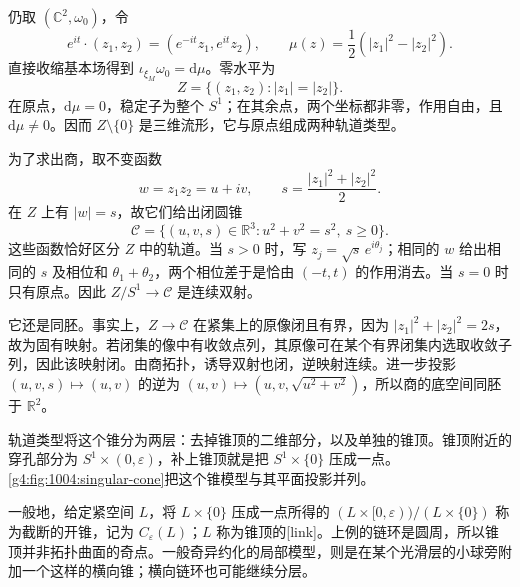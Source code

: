 \begin{example}\label{g4:exm:1004:singular-cone}
	仍取 \((\mathbb C^2,\omega_0)\)，令
	\begin{equation}\label{g4:eq:1004:opposite-weights}
		e^{it}\cdot(z_1,z_2)=(e^{-it}z_1,e^{it}z_2),
		\qquad \mu(z)=\frac12(|z_1|^2-|z_2|^2).
	\end{equation}
	直接收缩基本场得到 \(\iota_{\xi_M}\omega_0=\mathrm{d}\mu\)。零水平为
	\[
		Z=\{(z_1,z_2):|z_1|=|z_2|\}.
	\]
	在原点，\(\mathrm{d}\mu=0\)，稳定子为整个 \(S^1\)；在其余点，两个坐标都非零，作用自由，且 \(\mathrm{d}\mu\neq0\)。因而 \(Z\setminus\{0\}\) 是三维流形，它与原点组成两种轨道类型。

	为了求出商，取不变函数
	\[
		w=z_1z_2=u+iv,
		\qquad s=\frac{|z_1|^2+|z_2|^2}{2}.
	\]
	在 \(Z\) 上有 \(|w|=s\)，故它们给出闭圆锥
	\begin{equation}\label{g4:eq:1004:cone-equation}
		\mathcal C=\{(u,v,s)\in\mathbb R^3:u^2+v^2=s^2,\ s\ge0\}.
	\end{equation}
	这些函数恰好区分 \(Z\) 中的轨道。当 \(s>0\) 时，写 \(z_j=\sqrt{s}\,e^{i\theta_j}\)；相同的 \(w\) 给出相同的 \(s\) 及相位和 \(\theta_1+\theta_2\)，两个相位差于是恰由 \((-t,t)\) 的作用消去。当 \(s=0\) 时只有原点。因此 \(Z/S^1\to\mathcal C\) 是连续双射。

	它还是同胚。事实上，\(Z\to\mathcal C\) 在紧集上的原像闭且有界，因为 \(|z_1|^2+|z_2|^2=2s\)，故为固有映射。若闭集的像中有收敛点列，其原像可在某个有界闭集内选取收敛子列，因此该映射闭。由商拓扑，诱导双射也闭，逆映射连续。进一步投影 \((u,v,s)\mapsto(u,v)\) 的逆为 \((u,v)\mapsto(u,v,\sqrt{u^2+v^2})\)，所以商的底空间同胚于 \(\mathbb R^2\)。

	轨道类型将这个锥分为两层：去掉锥顶的二维部分，以及单独的锥顶。锥顶附近的穿孔部分为 \(S^1\times(0,\varepsilon)\)，补上锥顶就是把 \(S^1\times\{0\}\) 压成一点。\cref{g4:fig:1004:singular-cone}把这个锥模型与其平面投影并列。
\end{example}



一般地，给定紧空间 \(L\)，将 \(L\times\{0\}\) 压成一点所得的 \((L\times[0,\varepsilon))/(L\times\{0\})\) 称为截断的开锥，记为 \(C_{\varepsilon}(L)\)；\(L\) 称为锥顶的[link]。上例的链环是圆周，所以锥顶并非拓扑曲面的奇点。一般奇异约化的局部模型，则是在某个光滑层的小球旁附加一个这样的横向锥；横向链环也可能继续分层。

